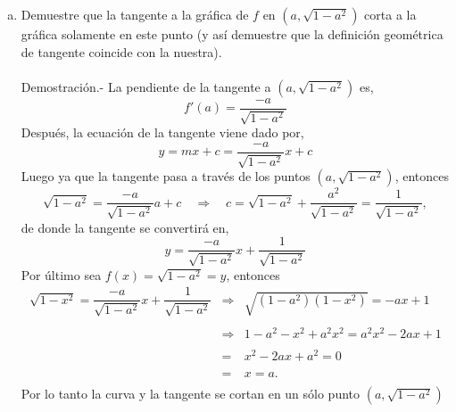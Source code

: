 \begin{enumerate}[\bfseries 1.]
\begin{enumerate}[(a)]
	     \item Demuestre que la tangente a la gráfica de $f$ en $\left(a,\sqrt{1-a^2}\right)$ corta a la gráfica solamente en este punto (y así demuestre que la definición geométrica de tangente coincide con la nuestra).\\\\
		 Demostración.-\; La pendiente de la tangente a $\left(a,\sqrt{1-a^2}\right)$ es,
		 $$f'(a)=\dfrac{-a}{\sqrt{1-a^2}}$$
		 Después, la ecuación de la tangente viene dado por,
		 $$y=mx+c=\dfrac{-a}{\sqrt{1-a^2}}x+c$$
		 Luego ya que la tangente pasa a través de los puntos $\left(a,\sqrt{1-a^2}\right)$, entonces
		 $$\sqrt{1-a^2}=\dfrac{-a}{\sqrt{1-a^2}}a+c\quad \Rightarrow \quad c=\sqrt{1-a^2}+\dfrac{a^2}{\sqrt{1-a^2}}=\dfrac{1}{\sqrt{1-a^2}},$$
		 de donde la tangente se convertirá en,
		 $$y=\dfrac{-a}{\sqrt{1-a^2}}x+\dfrac{1}{\sqrt{1-a^2}}$$
		 Por último sea $f(x)=\sqrt{1-a^2}=y$, entonces
		 $$\begin{array}{rcl}
		     \sqrt{1-x^2}=\dfrac{-a}{\sqrt{1-a^2}}x+\dfrac{1}{\sqrt{1-a^2}}& \Rightarrow & \sqrt{\left(1-a^2\right)\left(1-x^2\right)}=-ax+1\\\\
										   & \Rightarrow & 1-a^2-x^2+a^2x^2=a^2x^2-2ax+1\\\\
										   &=&x^2-2ax+a^2=0\\\\
										   &=&x=a.\\
		 \end{array}$$
		 Por lo tanto la curva y la tangente se cortan en un sólo punto $\left(a,\sqrt{1-a^2}\right)$\\\\

	 \end{enumerate}


\end{enumerate}

